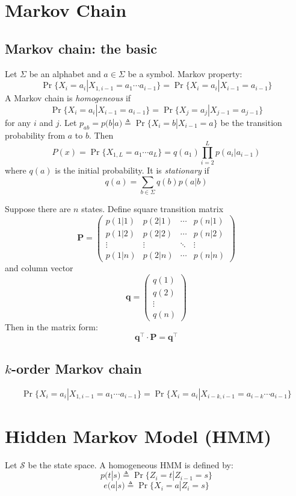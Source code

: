\documentclass[10pt]{article}
\begin{document}
\newpage

\section{Markov Chain}

\subsection{Markov chain: the basic}
Let $\Sigma$ be an alphabet and $a\in\Sigma$ be a symbol. Markov property:
$$
\Pr\{X_i=a_i|X_{1,i-1}=a_1\cdots a_{i-1}\}=\Pr\{X_i=a_i|X_{i-1}=a_{i-1}\}
$$
A Markov chain is \emph{homogeneous} if
$$
\Pr\{X_i=a_i|X_{i-1}=a_{i-1}\}=\Pr\{X_j=a_j|X_{j-1}=a_{j-1}\}
$$
for any $i$ and $j$. Let $p_{ab}=p(b|a)\triangleq\Pr\{X_i=b|X_{i-1}=a\}$ be the
transition probability from $a$ to $b$. Then
$$
P(x)=\Pr\{X_{1,L}=a_1\cdots a_L\}=q(a_1)\prod_{i=2}^Lp(a_i|a_{i-1})
$$
where $q(a)$ is the initial probability. It is \emph{stationary} if
$$
q(a)=\sum_{b\in\Sigma} q(b)p(a|b)
$$

Suppose there are $n$ states. Define square transition matrix
$$
\mathbf{P}=\left(\begin{array}{cccc}
p(1|1) & p(2|1) & \cdots & p(n|1) \\
p(1|2) & p(2|2) & \cdots & p(n|2) \\
\vdots & \vdots & \ddots & \vdots \\
p(1|n) & p(2|n) & \cdots & p(n|n)
\end{array}\right)
$$
and column vector
$$
\mathbf{q}=\left(\begin{array}{c}
q(1) \\
q(2) \\
\vdots\\
q(n)
\end{array}\right)
$$
Then in the matrix form:
$$
\mathbf{q}^\intercal\cdot\mathbf{P}=\mathbf{q}^\intercal
$$

\subsection{$k$-order Markov chain}
$$
\Pr\{X_i=a_i|X_{1,i-1}=a_1\cdots a_{i-1}\}=\Pr\{X_i=a_i|X_{i-k,i-1}=a_{i-k}\cdots a_{i-1}\}
$$

\newpage

\section{Hidden Markov Model (HMM)}
Let $\mathcal{S}$ be the state space. A homogeneous HMM is defined by:
$$
p(t|s)\triangleq\Pr\{Z_i=t|Z_{i-1}=s\}
$$
$$
e(a|s)\triangleq\Pr\{X_i=a|Z_i=s\}
$$
\end{document}
